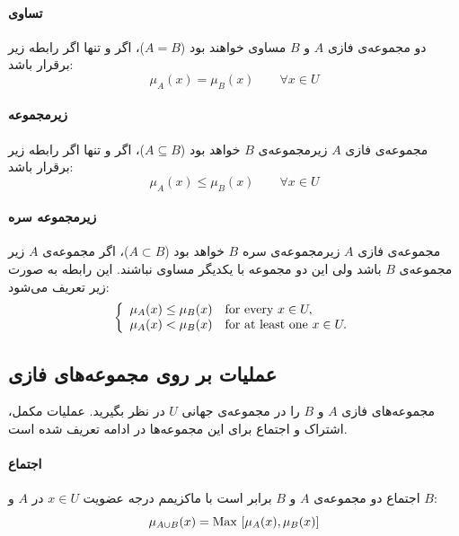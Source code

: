  \paragraph{تساوی}
دو مجموعه‌ی فازی $A$ و $B$ مساوی خواهند بود ($A=B$)، اگر و تنها اگر رابطه زیر برقرار باشد:
\begin{equation}\label{eq:e_fset_rel_eq}
 \mu_{A}(x) = \mu_{B}(x)\qquad \forall x\in U
\end{equation}
\paragraph{زیرمجموعه}
مجموعه‌ی فازی $A$ زیرمجموعه‌ی $B$ خواهد بود ($A \subseteq B$)، اگر و تنها اگر رابطه زیر برقرار باشد:
\begin{equation}\label{eq:e_fset_rel_subseteq}
\mu_{A}(x) \le \mu_{B}(x)\qquad \forall x\in U
\end{equation}
\paragraph{زیرمجموعه سره}
مجموعه‌ی فازی $A$ زیرمجموعه‌ی سره $B$ خواهد بود ($A \subset B$)، اگر مجموعه‌ی $A$ زیر مجموعه‌ی $B$ باشد ولی این دو مجموعه با یکدیگر مساوی نباشند. این رابطه به صورت زیر تعریف می‌شود:
\begin{equation}\label{eq:e_fset_rel_subset}
\left\{ \begin{array}{ll} 
\mu_{A}(x) \le \mu_{B}(x) &    {\rm for\ every}\ x \in U, \\
\mu_{A}(x) < \mu_{B}(x) &  {\rm for\ at\ least\ one}\ x \in U.
\end{array} \right.
\end{equation}
 \subsection{عملیات بر روی مجموعه‌های فازی}
 مجموعه‌های فازی $A$ و $B$ را در مجموعه‌ی جهانی $U$ در نظر بگیرید. عملیات مکمل، اشتراک و اجتماع برای این مجموعه‌ها در ادامه تعریف شده است.
\paragraph{اجتماع}
 اجتماع دو مجموعه‌ی $A$ و $B$ برابر است با ماکزیمم درجه عضویت $x \in U$ در $A$ و $B$:
 \begin{equation}\label{eq:e_fset_op_union}
 \mu_{A \cup B}(x) = {\rm Max}\ [\mu_{A}(x), \mu_{B}(x)]
 \end{equation}
